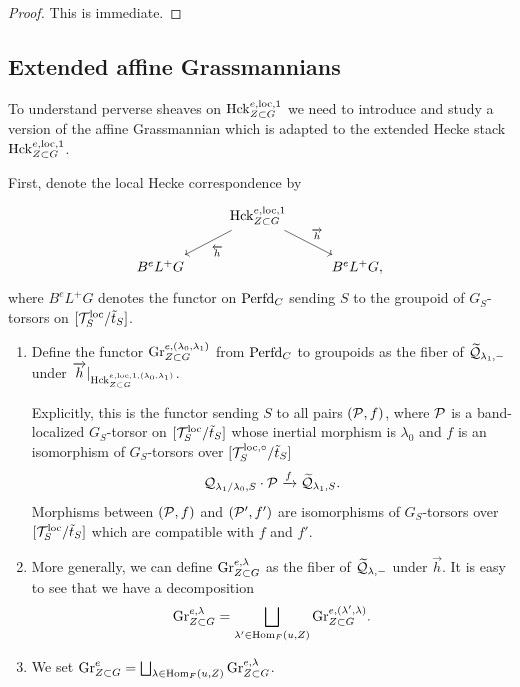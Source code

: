 \begin{proof}
    This is immediate.
\end{proof}

\subsection{Extended affine Grassmannians}
To understand perverse sheaves on $\mathrm{Hck}^{e,\mathrm{loc},1}_{Z \subset G}$ we need to introduce and study a version of the affine Grassmannian which is adapted to the extended Hecke stack $\mathrm{Hck}^{e,\mathrm{loc},1}_{Z \subset G}$.

First, denote the local Hecke correspondence by
\[
\begin{tikzcd}
    & \Hck_{Z \subset G}^{e,\loc,1} \arrow["\overleftarrow{h}"]{ld} \arrow["\overrightarrow{h}"]{rd}& \\
    B^{e}L^{+}G & & B^{e}L^{+}G,
\end{tikzcd}
\]
where $B^{e}L^{+}G$ denotes the functor on $\mathrm{Perfd}_{C}$ sending $S$ to the groupoid of $G_{S}$-torsors on $[\mathcal{T}_{S}^{\mathrm{loc}}/\tilde{t}_{S}]$.


\begin{defi}\label{defi:Gre} \begin{enumerate}
   \item{ Define the functor $\textnormal{Gr}_{Z \subset G}^{e,(\lambda_{0},\lambda_{1})}$ from $\mathrm{Perfd}_{C}$ to groupoids as the fiber of $\widetilde{\mathcal{Q}}_{\lambda_{1},-}$ under $\overrightarrow{h}|_{\mathrm{Hck}_{Z \subset G}^{e,\mathrm{loc},1,(\lambda_{0},\lambda_{1})}}$. 
   
   Explicitly, this is the functor sending $S$ to all pairs $(\mathcal{P}, f)$, where $\mathcal{P}$ is a band-localized $G_{S}$-torsor on $[\mathcal{T}_{S}^{\mathrm{loc}}/\tilde{t}_{S}]$ whose inertial morphism is $\lambda_{0}$ and $f$ is an isomorphism of  $G_{S}$-torsors over $[\mathcal{T}_{S}^{\mathrm{loc},\circ}/\tilde{t}_{S}]$
     \begin{equation*}
        \mathcal{Q}_{\lambda_{1}/\lambda_{0},S} \cdot \mathcal{P} \xrightarrow{f} \widetilde{\mathcal{Q}}_{\lambda_{1},S}.
     \end{equation*}
     Morphisms between $(\mathcal{P},f)$ and $(\mathcal{P}',f')$ are isomorphisms of $G_{S}$-torsors over $[\mathcal{T}_{S}^{\mathrm{loc}}/\tilde{t}_{S}]$ which are compatible with $f$ and $f'$. }

    \item{More generally, we can define $\textnormal{Gr}_{Z \subset G}^{e,\lambda}$ as the fiber of $\widetilde{\mathcal{Q}}_{\lambda,-}$ under $\overrightarrow{h}$.
         It is easy to see that we have a decomposition
     \begin{equation*}
         \textnormal{Gr}_{Z \subset G}^{e,\lambda} = \bigsqcup_{\lambda' \in \mathrm{Hom}_{F}(u,Z)} \textnormal{Gr}_{Z \subset G}^{e,(\lambda',\lambda)}.
     \end{equation*}}

\item{We set $\textnormal{Gr}_{Z \subset G}^{e} = \bigsqcup_{\lambda \in \mathrm{Hom}_{F}(u,Z)} \textnormal{Gr}_{Z \subset G}^{e,\lambda}$.}
     \end{enumerate}
     
\end{defi}

